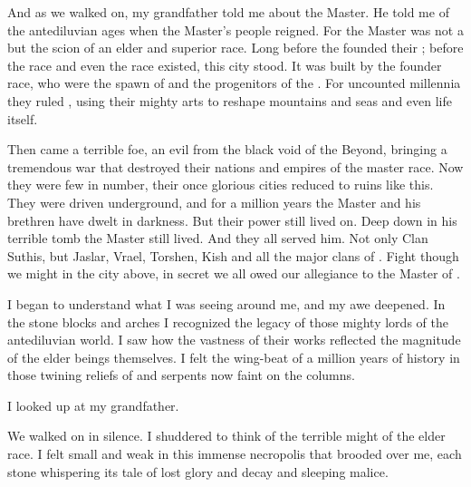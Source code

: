 \documentclass
  [a4paper,
   12pt,
   oneside
  ]%
  {article}
\begin{document}

And as we walked on, my grandfather told me about the Master. 
He told me of the antediluvian ages when the Master's people reigned.
For the Master was not a \scatha but the scion of an elder and superior race.%
\index{\scatha}
Long before the \humans founded their \VaimonCaliphate; before the \human race and even the \scatha race existed, this city stood.%
\index{\human}%
\index{\VaimonCaliphate}
It was built by the founder race, who were the spawn of \dragons and the progenitors of the \scathae.%
\index{\dragon}
For uncounted millennia they ruled \Miith, using their mighty arts to reshape mountains and seas and even life itself. 

Then came a terrible foe, an evil from the black void of the Beyond, bringing a tremendous war that destroyed their nations and empires of the master race.
Now they were few in number, their once glorious cities reduced to ruins like this.
They were driven underground, and for a million years the Master and his brethren have dwelt in darkness. 
But their power still lived on. 
Deep down in his terrible tomb the Master still lived.
And they all served him.
Not only Clan Suthis, but Jaslar, Vrael, Torshen, Kish and all the major clans of \Yormis.
Fight though we might in the city above, in secret we all owed our allegiance to the Master of \Yormis. 

I began to understand what I was seeing around me, and my awe deepened. 
In the stone blocks and arches I recognized the legacy of those mighty lords of the antediluvian world. 
I saw how the vastness of their works reflected the magnitude of the elder beings themselves. 
I felt the wing-beat of a million years of history in those twining reliefs of \dragons and serpents now faint on the columns.\index{\dragon}

I looked up at my grandfather.




We walked on in silence. 
I shuddered to think of the terrible might of the elder race. 
I felt small and weak in this immense necropolis that brooded over me, each stone whispering its tale of lost glory and decay and sleeping malice. 
\end{document}
